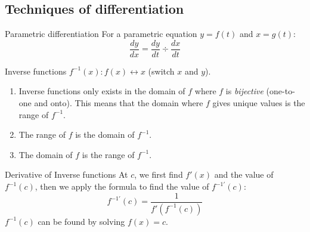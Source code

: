 \subsection{Techniques of differentiation}
\begin{knBox}
    {Parametric differentiation}
    For a parametric equation $y=f(t)$ and $x=g(t)$:
    \[\frac{dy}{dx}=\frac{dy}{dt}\div \frac{dx}{dt}\]
\end{knBox}
\begin{knBox}
    {Inverse functions}
    $f^{-1}(x): f(x)\leftrightarrow x$ (switch $x$ and $y$).
    \begin{enumerate}
        \item Inverse functions only exists in the domain of $f$ where $f$ is \emph{bijective} (one-to-one and onto). This means that the domain where $f$ gives unique values is the range of $f^{-1}$.
        \item The range of $f$ is the domain of $f^{-1}$.
        \item The domain of $f$ is the range of $f^{-1}$.
    \end{enumerate}
\end{knBox}
\begin{theorem}
    {Derivative of Inverse functions}
    At $c$, we first find $f'(x)$ and the value of $f^{-1}(c)$, then we apply the formula to find the value of $f^{-1'}(c)$:
    \[f^{-1'}(c)=\frac{1}{f'(f^{-1}(c))}\]
    $f^{-1}(c)$ can be found by solving $f(x)=c$.
\end{theorem}

